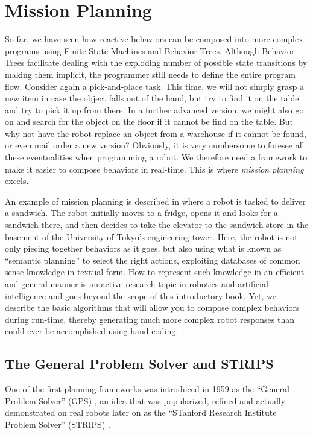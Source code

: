 \section{Mission Planning}\label{sec:strips}
So far, we have seen how reactive behaviors can be composed into more complex programs using Finite State Machines and Behavior Trees. Although Behavior Trees facilitate dealing with the exploding number of possible state transitions by making them implicit, the programmer still needs to define the entire program flow. Consider again a pick-and-place task. This time, we will not simply grasp a new item in case the object falls out of the hand, but try to find it on the table and try to pick it up from there. In a further advanced version, we might also go on and search for the object on the floor if it cannot be find on the table. But why not have the robot replace an object from a warehouse if it cannot be found, or even mail order a new version? Obviously, it is very cumbersome to foresee all these eventualities when programming a robot. We therefore need a framework to make it easier to compose behaviors in real-time. This is where \emph{mission planning} excels.

An example of mission planning is described in \cite{saito2011semantic} where a robot is tasked to deliver a sandwich. The robot initially moves to a fridge, opens it and looks for a sandwich there, and then decides to take the elevator to the sandwich store in the basement of the University of Tokyo's engineering tower. Here, the robot is not only piecing together behaviors as it goes, but also using what is known as ``semantic planning'' to select the right actions, exploiting databases of common sense knowledge in textual form. How to represent such knowledge in an efficient and general manner is an active research topic in robotics and artificial intelligence and goes beyond the scope of this introductory book. Yet, we describe the basic algorithms that will allow you to compose complex behaviors during run-time, thereby generating much more complex robot responses than could ever be accomplished using hand-coding.

\subsection{The General Problem Solver and STRIPS}
One of the first planning frameworks was introduced in 1959 as the ``General Problem Solver'' (GPS) \cite{newell1959report}, an idea that was popularized, refined and actually demonstrated on real robots later on as the ``STanford Research Institute Problem Solver'' (STRIPS) \cite{fikes1971strips}.

